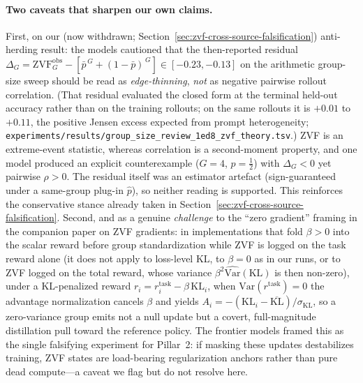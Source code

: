 \paragraph{Two caveats that sharpen our own claims.}
First, on our (now withdrawn; Section~\ref{sec:zvf-cross-source-falsification})
anti-herding result: the models cautioned that the
then-reported residual
$\Delta_G=\mathrm{ZVF}^{\mathrm{obs}}_G-[\bar p^{\,G}+(1-\bar p)^{\,G}]\in[-0.23,-0.13]$
on the arithmetic group-size sweep should be read as \emph{edge-thinning}, \emph{not}
as negative pairwise rollout correlation. (That residual evaluated the closed form
at the terminal held-out accuracy rather than on the training rollouts; on the same
rollouts it is $+0.01$ to $+0.11$, the positive Jensen excess expected from
prompt heterogeneity; \texttt{experiments/results/group\_size\_review\_1ed8\_zvf\_theory.tsv}.) ZVF is an extreme-event statistic, whereas correlation is a
second-moment property, and one model produced an explicit counterexample
($G=4$, $p=\tfrac12$) with $\Delta_G<0$ yet pairwise $\rho>0$. The residual itself was an estimator artefact (sign-guaranteed under a
same-group plug-in $\hat p$), so neither reading is supported. This
reinforces the conservative stance already taken in
Section~\ref{sec:zvf-cross-source-falsification}. Second, and as a genuine \emph{challenge}
to the ``zero gradient'' framing in the companion paper on ZVF gradients: in
implementations that fold $\beta>0$ into the scalar reward before
group standardization while ZVF is logged on the task reward alone (it does
not apply to loss-level KL, to $\beta=0$ as in our runs, or to ZVF logged on the
total reward, whose variance $\beta^2\widehat{\mathrm{Var}}(\mathrm{KL})$ is then
non-zero), under a KL-penalized reward $r_i=r^{\mathrm{task}}_i-\beta\,\mathrm{KL}_i$, when
$\mathrm{Var}(r^{\mathrm{task}})=0$ the advantage normalization cancels
$\beta$ and yields
$A_i=-(\mathrm{KL}_i-\overline{\mathrm{KL}})/\sigma_{\mathrm{KL}}$, so a
zero-variance group emits not a null update but a covert, full-magnitude
distillation pull toward the reference policy. The frontier models framed
this as the single falsifying experiment for Pillar~2: if masking these
updates destabilizes training, ZVF states are load-bearing regularization
anchors rather than pure dead compute---a caveat we flag but do not
resolve here.

